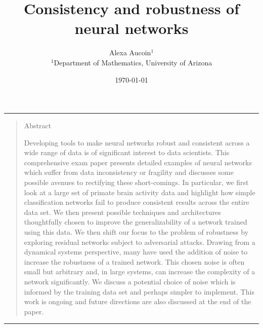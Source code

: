 \documentclass[12pt]{article}
\title{Consistency and robustness of neural networks}
\author{Alexa Aucoin$^{1}$ \\ \normalsize{$^{1}$Department of Mathematics, University of Arizona}}
\date{\today}
\newenvironment{sciabstract}{%
\begin{quote} \bf}
{\end{quote}}
\begin{document}
\maketitle

\hrule
\begin{sciabstract}
\begin{center} \large{Abstract}\end{center}
Developing tools to make neural networks robust and consistent across a wide range of data is of significant interest to data scientists. This comprehensive exam paper presents detailed examples of neural networks which suffer from data inconsistency or fragility and discusses some possible avenues to rectifying these short-comings. In particular, we first look at a large set of primate brain activity data and highlight how simple classification networks fail to produce consistent results across the entire data set. We then present possible techniques and architectures thoughtfully chosen to improve the generalizability of a network trained using this data. We then shift our focus to the problem of robustness by exploring residual networks subject to adversarial attacks. Drawing from a dynamical systems perspective, many have used the addition of noise to increase the robustness of a trained network. This chosen noise is often small but arbitrary and, in large systems, can increase the complexity of a network significantly. We discuss a potential choice of noise which is informed by the training data set and perhaps simpler to implement. This work is ongoing and future directions are also discussed at the end of the paper.
\end{sciabstract}
\hrule
\end{document}
